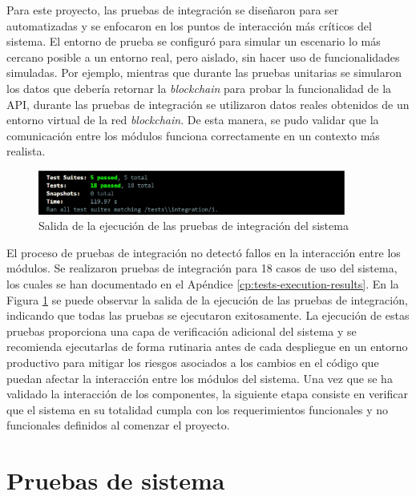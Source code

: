 Para este proyecto, las pruebas de integración se diseñaron para ser automatizadas y se enfocaron en los puntos de interacción más críticos del sistema. El entorno de prueba se configuró para simular un escenario lo más cercano posible a un entorno real, pero aislado, sin hacer uso de funcionalidades simuladas. Por ejemplo, mientras que durante las pruebas unitarias se simularon los datos que debería retornar la \textit{blockchain} para probar la funcionalidad de la API, durante las pruebas de integración se utilizaron datos reales obtenidos de un entorno virtual de la red \textit{blockchain}. De esta manera, se pudo validar que la comunicación entre los módulos funciona correctamente en un contexto más realista.

\begin{figure}[!htb]
	\centering
	\includegraphics[width=0.9\textwidth]{Figures/integration-test-results.png}
	\caption{Salida de la ejecución de las pruebas de integración del sistema}
	\label{fig:integration-test-results}
\end{figure}

El proceso de pruebas de integración no detectó fallos en la interacción entre los módulos. Se realizaron pruebas de integración para 18 casos de uso del sistema, los cuales se han documentado en el Apéndice \ref{cp:tests-execution-results}. En la Figura \ref{fig:integration-test-results} se puede observar la salida de la ejecución de las pruebas de integración, indicando que todas las pruebas se ejecutaron exitosamente. La ejecución de estas pruebas proporciona una capa de verificación adicional del sistema y se recomienda ejecutarlas de forma rutinaria antes de cada despliegue en un entorno productivo para mitigar los riesgos asociados a los cambios en el código que puedan afectar la interacción entre los módulos del sistema. Una vez que se ha validado la interacción de los componentes, la siguiente etapa consiste en verificar que el sistema en su totalidad cumpla con los requerimientos funcionales y no funcionales definidos al comenzar el proyecto.

\section{Pruebas de sistema}
\label{sec:system-testing}


